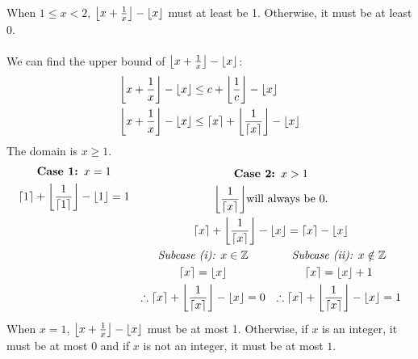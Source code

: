 \documentclass[article,12pt]{article}
\DeclarePairedDelimiter\ceil{\lceil}{\rceil}
\DeclarePairedDelimiter\floor{\lfloor}{\rfloor}
\newcommand{\ints}{\mathbb{Z}}
\begin{document}
When $1 \leq x < 2$, $\floor*{x + \frac{1}{x}} - \floor*{x}$ must at least be 1. Otherwise, it must be at least 0. \\ 
\\
We can find the upper bound of $\floor*{x + \frac{1}{x}} - \floor*{x}$: 
\begin{alignat*}{2}
    \floor*{x + \frac{1}{x}} - \floor*{x} &\leq c + \floor*{\frac{1}{c}} - \floor*{x} \\
    \floor*{x + \frac{1}{x}} - \floor*{x} &\leq \ceil*{x} + \floor*{\frac{1}{\ceil*{x}}} - \floor*{x}
\end{alignat*}
The domain is $x \geq 1$. 
\begin{align*}
    \begin{gathered}
       \textbf{Case 1: $x = 1$} \\
       \ceil*{1} + \floor*{\frac{1}{\ceil*{1}}} - \floor*{1} = 1 \\
       \\
       \\
       \\
       \\
       \\
       \\
    \end{gathered}
    &&
    \begin{gathered}
        \textbf{Case 2: $x > 1$} \\
        \floor*{\frac{1}{\ceil*{x}}} \text{will always be 0.} \\ 
        \ceil*{x} + \floor*{\frac{1}{\ceil*{x}}} - \floor*{x} = \ceil*{x} - \floor*{x} \\
        \begin{aligned}
            \begin{gathered}
                \textit{Subcase (i): $x \in\ints$} \\
                \ceil*{x} = \floor*{x} \\
                \therefore \ceil*{x} + \floor*{\frac{1}{\ceil*{x}}} - \floor*{x} = 0
            \end{gathered}
            && 
            \begin{gathered}
                \textit{Subcase (ii): $x \notin\ints$} \\
                \ceil*{x} = \floor*{x} + 1 \\
                \therefore \ceil*{x} + \floor*{\frac{1}{\ceil*{x}}} - \floor*{x} = 1
            \end{gathered}
        \end{aligned}
    \end{gathered}
    \end{align*}
When $x = 1$, $\floor*{x + \frac{1}{x}} - \floor*{x}$ must be at most 1. Otherwise, if $x$ is an integer, it must be at most 0 and if $x$ is not an integer, it must be at most $1$. \\
\end{document}

